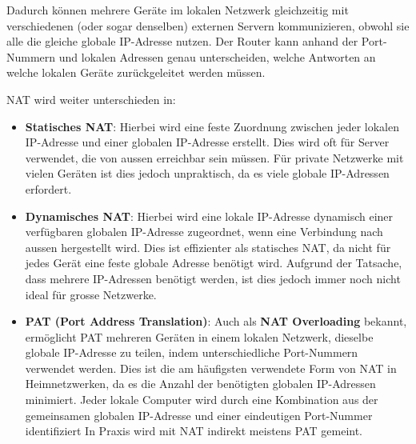 \begin{myexample}
Dadurch können mehrere Geräte im lokalen Netzwerk gleichzeitig mit verschiedenen (oder sogar denselben) externen Servern kommunizieren, obwohl sie alle die gleiche globale \gls{IP}-Adresse nutzen. Der Router kann anhand der Port-Nummern und lokalen Adressen genau unterscheiden, welche Antworten an welche lokalen Geräte zurückgeleitet werden müssen.
\end{myexample}

\gls{NAT} wird weiter unterschieden in:
\begin{itemize}
    \item \textbf{Statisches NAT}: Hierbei wird eine feste Zuordnung zwischen jeder lokalen \gls{IP}-Adresse und einer globalen \gls{IP}-Adresse erstellt. Dies wird oft für Server verwendet, die von aussen erreichbar sein müssen. Für private Netzwerke mit vielen Geräten ist dies jedoch unpraktisch, da es viele globale \gls{IP}-Adressen erfordert.
    \item \textbf{Dynamisches NAT}: Hierbei wird eine lokale \gls{IP}-Adresse dynamisch einer verfügbaren globalen \gls{IP}-Adresse zugeordnet, wenn eine Verbindung nach aussen hergestellt wird. Dies ist effizienter als statisches \gls{NAT}, da nicht für jedes Gerät eine feste globale Adresse benötigt wird. Aufgrund der Tatsache, dass mehrere \gls{IP}-Adressen benötigt werden, ist dies jedoch immer noch nicht ideal für grosse Netzwerke.
    \item \textbf{\gls{PAT} (Port Address Translation)}: Auch als \textbf{NAT Overloading} bekannt, ermöglicht \gls{PAT} mehreren Geräten in einem lokalen Netzwerk, dieselbe globale \gls{IP}-Adresse zu teilen, indem unterschiedliche Port-Nummern verwendet werden. Dies ist die am häufigsten verwendete Form von \gls{NAT} in Heimnetzwerken, da es die Anzahl der benötigten globalen \gls{IP}-Adressen minimiert. Jeder lokale Computer wird durch eine Kombination aus der gemeinsamen globalen \gls{IP}-Adresse und einer eindeutigen Port-Nummer identifiziert In Praxis wird mit \gls{NAT} indirekt meistens \gls{PAT} gemeint.
\end{itemize}

